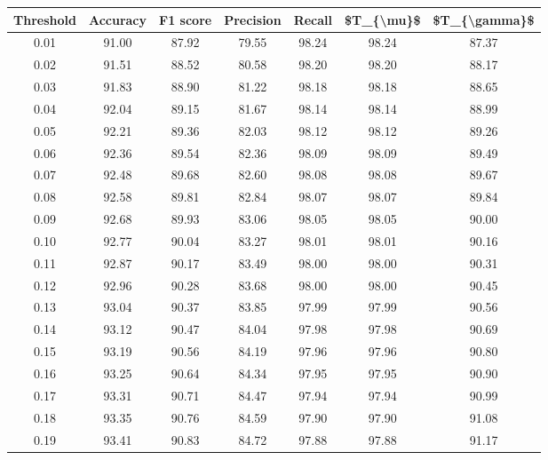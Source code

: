 \begin{tabular}{|c|c|c|c|c|c|c|}
\hline
 Threshold &  Accuracy &  F1 score &  Precision &  Recall &  \$T\_\{\textbackslash mu\}\$ &  \$T\_\{\textbackslash gamma\}\$ \\
\hline
      0.01 &     91.00 &     87.92 &      79.55 &   98.24 &      98.24 &         87.37 \\
      0.02 &     91.51 &     88.52 &      80.58 &   98.20 &      98.20 &         88.17 \\
      0.03 &     91.83 &     88.90 &      81.22 &   98.18 &      98.18 &         88.65 \\
      0.04 &     92.04 &     89.15 &      81.67 &   98.14 &      98.14 &         88.99 \\
      0.05 &     92.21 &     89.36 &      82.03 &   98.12 &      98.12 &         89.26 \\
      0.06 &     92.36 &     89.54 &      82.36 &   98.09 &      98.09 &         89.49 \\
      0.07 &     92.48 &     89.68 &      82.60 &   98.08 &      98.08 &         89.67 \\
      0.08 &     92.58 &     89.81 &      82.84 &   98.07 &      98.07 &         89.84 \\
      0.09 &     92.68 &     89.93 &      83.06 &   98.05 &      98.05 &         90.00 \\
      0.10 &     92.77 &     90.04 &      83.27 &   98.01 &      98.01 &         90.16 \\
      0.11 &     92.87 &     90.17 &      83.49 &   98.00 &      98.00 &         90.31 \\
      0.12 &     92.96 &     90.28 &      83.68 &   98.00 &      98.00 &         90.45 \\
      0.13 &     93.04 &     90.37 &      83.85 &   97.99 &      97.99 &         90.56 \\
      0.14 &     93.12 &     90.47 &      84.04 &   97.98 &      97.98 &         90.69 \\
      0.15 &     93.19 &     90.56 &      84.19 &   97.96 &      97.96 &         90.80 \\
      0.16 &     93.25 &     90.64 &      84.34 &   97.95 &      97.95 &         90.90 \\
      0.17 &     93.31 &     90.71 &      84.47 &   97.94 &      97.94 &         90.99 \\
      0.18 &     93.35 &     90.76 &      84.59 &   97.90 &      97.90 &         91.08 \\
      0.19 &     93.41 &     90.83 &      84.72 &   97.88 &      97.88 &         91.17 \\

\end{tabular}
